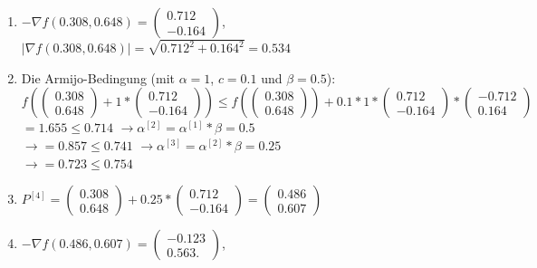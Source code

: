 \documentclass[naustrian]{article}
\begin{document}
{\begin{enumerate}
	\item
	$-{\nabla}f(0.308,0.648) = \left( \begin{array}{c} 0.712 \\ -0.164 \end{array} \right)$, \\
	$|{\nabla}f(0.308,0.648)| = \sqrt{0.712^2+0.164^2} = 0.534$
	\item
	Die Armijo-Bedingung (mit $\alpha = 1$, $c = 0.1$ und $\beta = 0.5$):\\
	$f( \left( \begin{array}{c} 0.308 \\ 0.648 \end{array} \right) + 1 * \left( \begin{array}{c} 0.712 \\ -0.164 \end{array} \right)) \leq f(\left( \begin{array}{c} 0.308 \\ 0.648 \end{array} \right)) + 0.1 * 1 *  \left( \begin{array}{c} 0.712 \\ -0.164 \end{array} \right) * \left( \begin{array}{c} -0.712 \\ 0.164 \end{array} \right)$ \\
	$= 1.655 \leq 0.714$
	$\rightarrow \alpha^{[2]} = \alpha^{[1]} * \beta = 0.5$ \\
	$\rightarrow = 0.857 \leq 0.741$
	$\rightarrow \alpha^{[3]} = \alpha^{[2]} * \beta = 0.25$ \\
	$\rightarrow = 0.723 \leq 0.754$
	\item
	$P^{[4]} = \left( \begin{array}{c} 0.308 \\ 0.648 \end{array} \right) + 0.25 * \left( \begin{array}{c} 0.712 \\ -0.164 \end{array} \right) = \left( \begin{array}{c} 0.486 \\ 0.607 \end{array} \right)$
	\item
	$-{\nabla}f(0.486,0.607) = \left( \begin{array}{c} -0.123 \\ 0.563. \end{array} \right)$, \\

\end{enumerate}}
\end{document}
